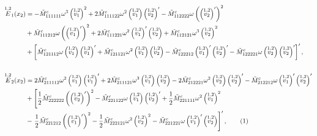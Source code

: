 \documentclass[11pt]{report}
\begin{document}
\begin{appendices}
\begin{align*}
\overset{{1,2}}{E}_1(x_2) &= -\tilde{M}^c_{111111} \omega^3 \left (\overset{{1,2}}{v_1} \right)^2 + 2 \tilde{M}^c_{111122} \omega^2 \left (\overset{{1,2}}{v_1} \right) \left (\overset{{1,2}}{v_2} \right)^\prime - \tilde{M}^c_{112222} \omega \left(\left (\overset{{1,2}}{v_2} \right)^\prime \right)^2 \\
&+ \tilde{M}^c_{111212} \omega \left(\left (\overset{{1,2}}{v_1} \right)^\prime \right)^2 +  2 \tilde{M}^c_{111221} \omega^2 \left (\overset{{1,2}}{v_1} \right)^\prime \left (\overset{{1,2}}{v_2} \right) + \tilde{M}^c_{112121} \omega^3 \left (\overset{{1,2}}{v_2} \right)^2 \\
&+ \left[ \tilde{M}^c_{121112} \omega \left(\overset{{1,2}}{v_1} \right) \left(\overset{{1,2}}{v_1} \right)^\prime + \tilde{M}^c_{121121} \omega^2 \left (\overset{{1,2}}{v_1} \right) \left (\overset{{1,2}}{v_2} \right) - \tilde{M}^c_{122212} \left (\overset{{1,2}}{v_1} \right)^\prime \left (\overset{{1,2}}{v_2} \right)^\prime - \tilde{M}^c_{122221} \omega \left (\overset{{1,2}}{v_2} \right) \left (\overset{{1,2}}{v_2} \right)^\prime \right]^\prime, \\
\\
\overset{{1,2}}{E}_2(x_2) &= 2\tilde{M}^c_{211112} \omega^2 \left(\overset{{1,2}}{v_1} \right) \left(\overset{{1,2}}{v_1} \right)^\prime + 2\tilde{M}^c_{211121} \omega^3 \left(\overset{{1,2}}{v_1} \right) \left(\overset{{1,2}}{v_2} \right) - 2 \tilde{M}^c_{212221} \omega^2 \left(\overset{{1,2}}{v_2} \right) \left(\overset{{1,2}}{v_2} \right)^\prime - \tilde{M}^c_{212212} \omega \left(\overset{{1,2}}{v_1} \right)^\prime \left(\overset{{1,2}}{v_2} \right)^\prime \\
&+ \left[ \frac{1}{2} \tilde{M}^c_{222222} \left(\left (\overset{{1,2}}{v_2} \right)^\prime \right)^2 - \tilde{M}^c_{221122} \omega \left(\overset{{1,2}}{v_1} \right) \left(\overset{{1,2}}{v_2} \right)^\prime + \frac{1}{2} \tilde{M}^c_{221111} \omega^2 \left(\overset{{1,2}}{v_1} \right)^2 \right. \\
&- \left. \frac{1}{2} \tilde{M}^c_{221212} \left(\left (\overset{{1,2}}{v_1} \right)^\prime \right)^2 - \frac{1}{2} \tilde{M}^c_{222121} \omega^2 \left(\overset{{1,2}}{v_2} \right)^2 - \tilde{M}^c_{221221} \omega \left(\overset{{1,2}}{v_1} \right)^\prime \left(\overset{{1,2}}{v_2} \right) \right]^\prime , \tag{\stepcounter{equation}\theequation} \\
\\
\\
\\

\end{align*}
\end{appendices}
\end{document}
